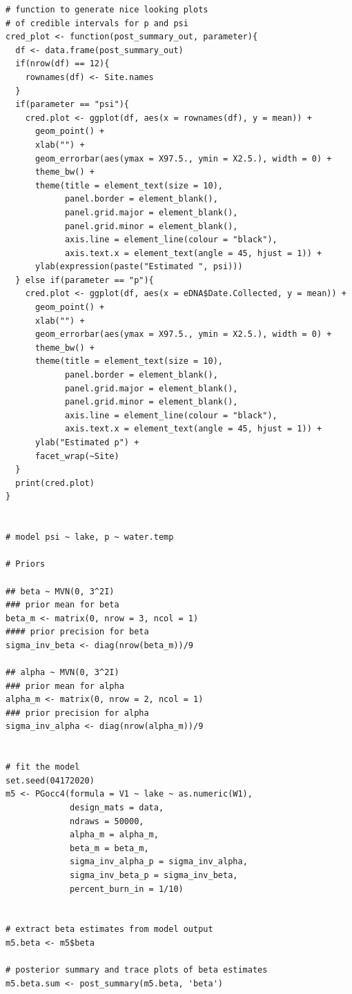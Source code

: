\documentclass[12pt]{article}\usepackage[]{graphicx}\usepackage[]{color}
\makeatletter
\newenvironment{kframe}{%
 \def\at@end@of@kframe{}%
 \ifinner\ifhmode%
  \def\at@end@of@kframe{\end{minipage}}%
  \begin{minipage}{\columnwidth}%
 \fi\fi%
 \def\FrameCommand##1{\hskip\@totalleftmargin \hskip-\fboxsep
 \colorbox{shadecolor}{##1}\hskip-\fboxsep
     \hskip-\linewidth \hskip-\@totalleftmargin \hskip\columnwidth}%
 \MakeFramed {\advance\hsize-\width
   \@totalleftmargin\z@ \linewidth\hsize
   \@setminipage}}%
 {\par\unskip\endMakeFramed%
 \at@end@of@kframe}
\newenvironment{knitrout}{}{} %
\newenvironment{kframe}{%
 \def\at@end@of@kframe{}%
 \ifinner\ifhmode%
  \def\at@end@of@kframe{\end{minipage}}%
  \begin{minipage}{\columnwidth}%
 \fi\fi%
 \def\FrameCommand##1{\hskip\@totalleftmargin \hskip-\fboxsep
 \colorbox{shadecolor}{##1}\hskip-\fboxsep
     \hskip-\linewidth \hskip-\@totalleftmargin \hskip\columnwidth}%
 \MakeFramed {\advance\hsize-\width
   \@totalleftmargin\z@ \linewidth\hsize
   \@setminipage}}%
 {\par\unskip\endMakeFramed%
 \at@end@of@kframe}
\newenvironment{knitrout}{}{} %
\makeatother
\begin{document}
\begin{small}
\begin{knitrout}
\begin{kframe}
\begin{verbatim}
# function to generate nice looking plots
# of credible intervals for p and psi
cred_plot <- function(post_summary_out, parameter){
  df <- data.frame(post_summary_out)
  if(nrow(df) == 12){
    rownames(df) <- Site.names
  } 
  if(parameter == "psi"){
    cred.plot <- ggplot(df, aes(x = rownames(df), y = mean)) + 
      geom_point() + 
      xlab("") + 
      geom_errorbar(aes(ymax = X97.5., ymin = X2.5.), width = 0) + 
      theme_bw() + 
      theme(title = element_text(size = 10),
            panel.border = element_blank(), 
            panel.grid.major = element_blank(),
            panel.grid.minor = element_blank(), 
            axis.line = element_line(colour = "black"), 
            axis.text.x = element_text(angle = 45, hjust = 1)) +
      ylab(expression(paste("Estimated ", psi))) 
  } else if(parameter == "p"){
    cred.plot <- ggplot(df, aes(x = eDNA$Date.Collected, y = mean)) + 
      geom_point() + 
      xlab("") + 
      geom_errorbar(aes(ymax = X97.5., ymin = X2.5.), width = 0) + 
      theme_bw() + 
      theme(title = element_text(size = 10),
            panel.border = element_blank(), 
            panel.grid.major = element_blank(),
            panel.grid.minor = element_blank(), 
            axis.line = element_line(colour = "black"), 
            axis.text.x = element_text(angle = 45, hjust = 1)) + 
      ylab("Estimated p") + 
      facet_wrap(~Site) 
  }
  print(cred.plot)
}
  

# model psi ~ lake, p ~ water.temp

# Priors 

## beta ~ MVN(0, 3^2I)
### prior mean for beta
beta_m <- matrix(0, nrow = 3, ncol = 1) 
#### prior precision for beta
sigma_inv_beta <- diag(nrow(beta_m))/9 

## alpha ~ MVN(0, 3^2I)
### prior mean for alpha
alpha_m <- matrix(0, nrow = 2, ncol = 1) 
### prior precision for alpha
sigma_inv_alpha <- diag(nrow(alpha_m))/9 


# fit the model 
set.seed(04172020)
m5 <- PGocc4(formula = V1 ~ lake ~ as.numeric(W1), 
             design_mats = data, 
             ndraws = 50000, 
             alpha_m = alpha_m, 
             beta_m = beta_m, 
             sigma_inv_alpha_p = sigma_inv_alpha, 
             sigma_inv_beta_p = sigma_inv_beta, 
             percent_burn_in = 1/10)


# extract beta estimates from model output
m5.beta <- m5$beta

# posterior summary and trace plots of beta estimates
m5.beta.sum <- post_summary(m5.beta, 'beta')



\end{verbatim}
\end{kframe}
\end{knitrout}
\end{small}
\end{document}
